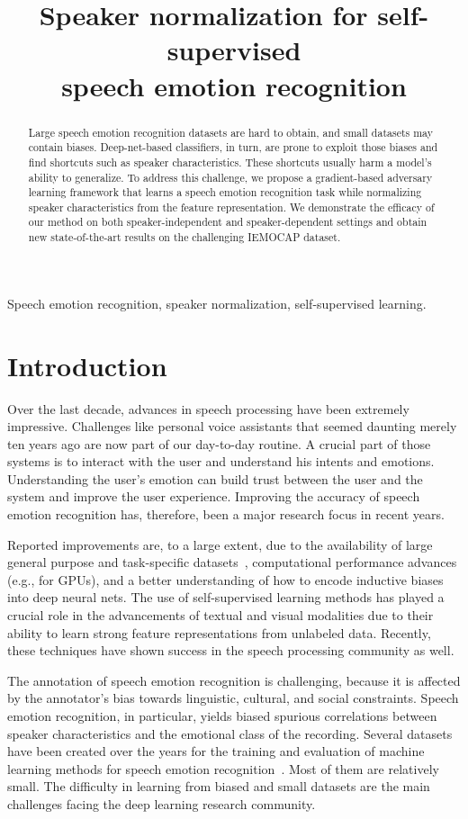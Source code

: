 \documentclass{article}
\title{Speaker normalization for self-supervised \\ speech emotion recognition}
\renewcommand{\[}{\begin{eqnarray}}
\renewcommand{\]}{\end{eqnarray}}
\begin{document}
\maketitle
\begin{abstract}
     Large speech emotion recognition datasets are hard to obtain, and small datasets may contain biases. Deep-net-based classifiers, in turn, are prone to exploit those biases and find shortcuts such as speaker characteristics. These shortcuts usually harm a model's ability to generalize. To address this challenge, we propose a gradient-based adversary learning framework that learns a speech emotion recognition task while normalizing speaker characteristics from the feature representation. We demonstrate the efficacy of our method on both speaker-independent and speaker-dependent settings and obtain new state-of-the-art results on the challenging IEMOCAP dataset.
\end{abstract}
\begin{keywords}
Speech emotion recognition, speaker normalization, self-supervised learning.
\end{keywords}
\section{Introduction}

Over the last decade, advances in speech processing have been extremely impressive. Challenges like personal voice assistants that seemed daunting merely ten years ago are now part of our day-to-day routine. A crucial part of those systems is to interact with the user and  understand his intents and emotions. Understanding the user's emotion can build trust between the user and the system and improve the user experience. Improving the accuracy of speech emotion recognition has, therefore, been a major research focus in recent years.

Reported improvements are, to a large extent, due to the availability of large general purpose and task-specific datasets~\cite{voxceleb, librispeech}, computational performance advances (e.g., for GPUs), and a better understanding of how to encode inductive biases into deep neural nets. The use of self-supervised learning methods has played a crucial role in the advancements of textual and visual modalities due to their ability to learn strong feature representations from unlabeled data. Recently, these techniques have shown success in the speech processing community as well.

The annotation of speech emotion recognition is challenging, because it is affected by the annotator's bias towards linguistic, cultural, and social constraints. Speech emotion recognition, in particular, yields biased spurious correlations between speaker characteristics and the emotional class of the recording. Several datasets have been created over the years for the training and evaluation of machine learning methods for speech emotion recognition~\cite{iemocap, RAVDESS, savee}. Most of them are relatively small. The difficulty in learning from biased and small datasets are the main challenges facing the deep learning research community.
\end{document}
